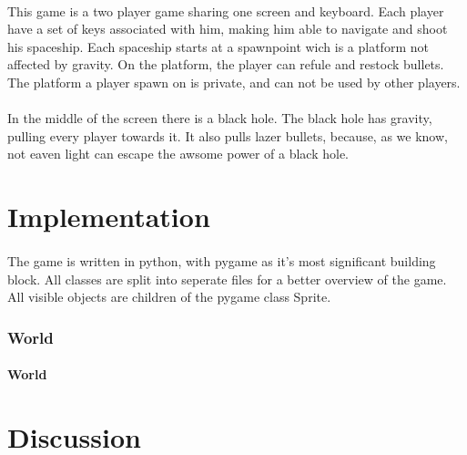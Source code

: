 \documentclass{article}
\begin{document}
\paragraph{}
This game is a two player game sharing one screen and keyboard. Each player have a set of keys associated with him, making him able to navigate and shoot his spaceship. Each spaceship starts at a spawnpoint wich is a platform not affected by gravity. On the platform, the player can refule and restock bullets. The platform a player spawn on is private, and can not be used by other players. 
\paragraph{}
In the middle of the screen there is a black hole. The black hole has gravity, pulling every player towards it. It also pulls lazer bullets, because, as we know, not eaven light can escape the awsome power of a black hole. 
\paragraph{}


\section{Implementation}
\paragraph{}
The game is written in python, with pygame as it's most significant building block. All classes are split into seperate files for a better overview of the game. All visible objects are children of the pygame class Sprite.
\subsubsection{World}
\paragraph{World}


\section{Discussion}
\end{document}
